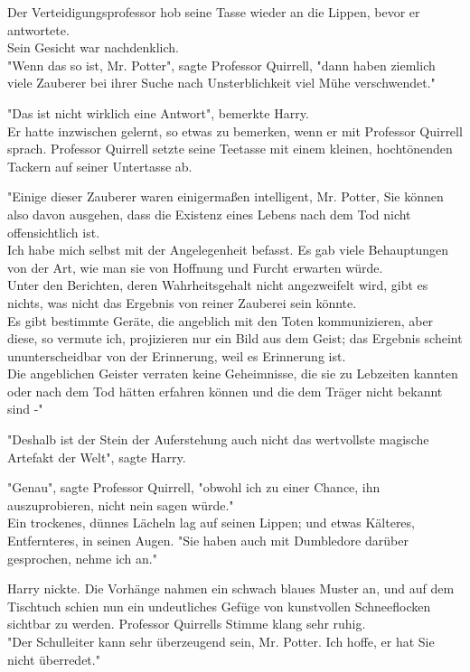 {Der Verteidigungsprofessor hob seine Tasse wieder an die Lippen, bevor er antwortete.\\ Sein Gesicht war nachdenklich.\\ "Wenn das so ist, Mr. Potter", sagte Professor Quirrell, "dann haben ziemlich viele Zauberer bei ihrer Suche nach Unsterblichkeit viel Mühe verschwendet."

"Das ist nicht wirklich eine Antwort", bemerkte Harry.\\ Er hatte inzwischen gelernt, so etwas zu bemerken, wenn er mit Professor Quirrell sprach. Professor Quirrell setzte seine Teetasse mit einem kleinen, hochtönenden Tackern auf seiner Untertasse ab.

"Einige dieser Zauberer waren einigermaßen intelligent, Mr. Potter, Sie können also davon ausgehen, dass die Existenz eines Lebens nach dem Tod nicht offensichtlich ist.\\ Ich habe mich selbst mit der Angelegenheit befasst. Es gab viele Behauptungen von der Art, wie man sie von Hoffnung und Furcht erwarten würde.\\ Unter den Berichten, deren Wahrheitsgehalt nicht angezweifelt wird, gibt es nichts, was nicht das Ergebnis von reiner Zauberei sein könnte.\\ Es gibt bestimmte Geräte, die angeblich mit den Toten kommunizieren, aber diese, so vermute ich, projizieren nur ein Bild aus dem Geist; das Ergebnis scheint ununterscheidbar von der Erinnerung, weil es Erinnerung ist.\\ Die angeblichen Geister verraten keine Geheimnisse, die sie zu Lebzeiten kannten oder nach dem Tod hätten erfahren können und die dem Träger nicht bekannt sind -"

"Deshalb ist der Stein der Auferstehung auch nicht das wertvollste magische Artefakt der Welt", sagte Harry.

"Genau", sagte Professor Quirrell, "obwohl ich zu einer Chance, ihn auszuprobieren, nicht nein sagen würde."\\ Ein trockenes, dünnes Lächeln lag auf seinen Lippen; und etwas Kälteres, Entfernteres, in seinen Augen. "Sie haben auch mit Dumbledore darüber gesprochen, nehme ich an."

Harry nickte. Die Vorhänge nahmen ein schwach blaues Muster an, und auf dem Tischtuch schien nun ein undeutliches Gefüge von kunstvollen Schneeflocken sichtbar zu werden. Professor Quirrells Stimme klang sehr ruhig.\\ "Der Schulleiter kann sehr überzeugend sein, Mr. Potter. Ich hoffe, er hat Sie nicht überredet."

}
